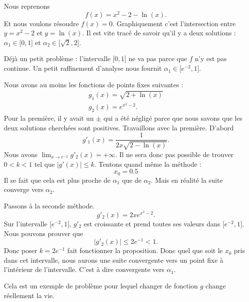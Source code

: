 \begin{example}
    Nous reprenons
    \begin{equation}
        f(x)=x^2-2-\ln(x).
    \end{equation}
    Et nous voulons résoudre \( f(x)=0\). Graphiquement c'est l'intersection entre \( y=x^2-2\) et \( y=\ln(x)\). Il est vite tracé de savoir qu'il y a deux solutions  : \( \alpha_1\in\mathopen[ 0 , 1 \mathclose]\) et \( \alpha_2\in\mathopen[ \sqrt{2} , 2 \mathclose]\).

    Déjà un petit problème : l'intervalle \( \mathopen[ 0 , 1 \mathclose]\) ne va pas parce que \( f\) n'y est pas continue. Un petit raffinement d'analyse nous fournit \( \alpha_1\in\mathopen[ e^{-2} , 1 \mathclose]\).

    Nous avons au moins les fonctions de points fixes suivantes :
    \begin{subequations}
        \begin{align}
            g_1(x)=\sqrt{ 2+\ln(x) }\\
            g_2(x)=e^{x^2-2}.
        \end{align}
    \end{subequations}
    Pour la première, il y avait un \( \pm\) qui a été négligé parce que nous savons que les deux solutions cherchées sont positives.
    Travaillons avec la première. D'abord
    \begin{equation}
        g'_1(x)=\frac{ 1 }{ 2x\sqrt{ 2-\ln(x) } }.
    \end{equation}
    Nous avons \( \lim_{x\to e^{-2}} g'_2(x)=+\infty\). Il ne sera donc pas possible de trouver \( 0<k<1\) tel que \( | g'(x) |\leq k\). Tentons quand même la méthode :
    \begin{equation}
        x_0=0.5
    \end{equation}
    Il se fait que cela est plus proche de \( \alpha_1\) que de \( \alpha_2\). Mais en réalité la suite converge vers \( \alpha_2\).

    Passons à la seconde méthode.
    \begin{equation}
        g'_2(x)=2xe^{x^2-2}.
    \end{equation}
    Sur l'intervalle \( \mathopen[ e^{-2} , 1 \mathclose]\), \( g'_2\) est croissante et prend toutes ses valeurs dans \( \mathopen[ e^{-2} , 1 \mathclose]\). Nous pouvons prouver que
    \begin{equation}
        | g'_2(x) |\leq 2e^{-1}<1.
    \end{equation}
    Donc poser \( k=2e^{-1}\) fait fonctionner la proposition. Donc quel que soit le \( x_0\) pris dans cet intervalle, nous aurons une suite convergente vers un point fixe à l'intérieur de l'intervalle. C'est à dire convergente vers \( \alpha_1\).

    Cela est un exemple de problème pour lequel changer de fonction \( g\) change réellement la vie.
\end{example}


